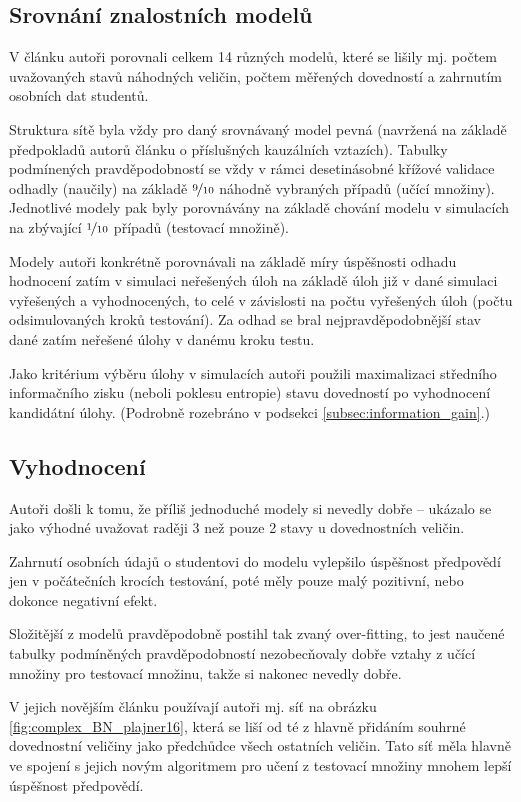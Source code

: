 \documentclass[a4paper,twoside,12pt]{scrbook}
\begin{document}
\subsection{Srovnání znalostních modelů}
V článku autoři porovnali celkem 14 různých modelů, které se lišily mj. počtem uvažovaných stavů náhodných veličin, počtem měřených dovedností a zahrnutím osobních dat studentů.

Struktura sítě byla vždy pro daný srovnávaný model pevná (navržená na základě předpokladů autorů článku o příslušných kauzálních vztazích). Tabulky podmínených pravděpodobností se vždy v rámci desetinásobné křížové validace odhadly (naučily) na základě $\nicefrac{9}{10}$ náhodně vybraných případů (učící množiny). Jednotlivé modely pak byly porovnávány na základě chování modelu v simulacích na zbývající $\nicefrac{1}{10}$ případů (testovací množině).

Modely autoři konkrétně porovnávali na základě míry úspěšnosti odhadu hodnocení zatím v simulaci neřešených úloh na základě úloh již v dané simulaci vyřešených a vyhodnocených, to celé v závislosti na počtu vyřešených úloh (počtu odsimulovaných kroků testování). Za odhad se bral nejpravděpodobnější stav dané zatím neřešené úlohy v danému kroku testu.

Jako kritérium výběru úlohy v simulacích autoři použili maximalizaci středního informačního zisku (neboli poklesu entropie) stavu dovedností po vyhodnocení kandidátní úlohy. (Podrobně rozebráno v podsekci \ref{subsec:information_gain}.)

\subsection{Vyhodnocení}
Autoři došli k tomu, že příliš jednoduché modely si nevedly dobře -- ukázalo se jako výhodné uvažovat raději 3 než pouze 2 stavy u dovednostních veličin.

Zahrnutí osobních údajů o studentovi do modelu vylepšilo úspěšnost předpovědí jen v počátečních krocích testování, poté měly pouze malý pozitivní, nebo dokonce negativní efekt.

Složitější z modelů pravděpodobně postihl tak zvaný over-fitting, to jest naučené tabulky podmíněných pravděpodobností nezobecňovaly dobře vztahy z učící množiny pro testovací množinu, takže si nakonec nevedly dobře.

V jejich novějším článku \cite{plajner16} používají autoři mj. síť na obrázku \ref{fig:complex_BN_plajner16}, která se liší od té z \cite{vomlel_plajner2015} hlavně přidáním souhrné dovednostní veličiny jako předchůdce všech ostatních veličin. Tato síť měla hlavně ve spojení s jejich novým algoritmem pro učení z testovací množiny mnohem lepší úspěšnost předpovědí.
\end{document}
